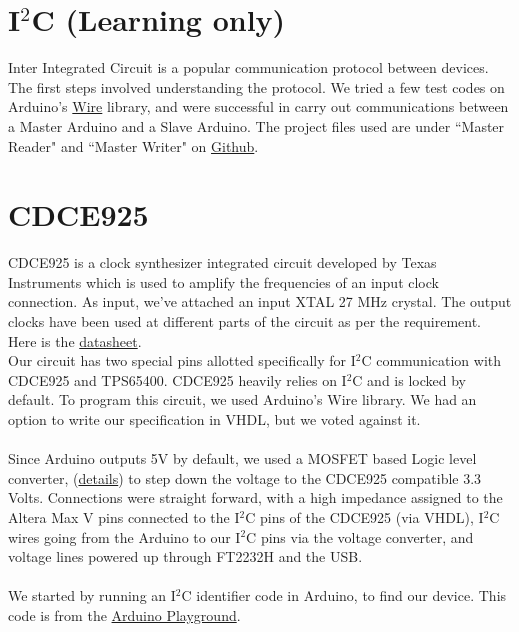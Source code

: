 \documentclass[11pt]{article}
\begin{document}
\section{I$^2$C (Learning only)}

Inter Integrated Circuit is a popular communication protocol between devices. The first steps involved understanding the protocol. We tried a few test codes on Arduino's \href{https://www.arduino.cc/en/Reference/Wire}{Wire} library, and were successful in carry out communications between a Master Arduino and a Slave Arduino. The project files used are under ``Master Reader" and ``Master Writer" on \href{https://github.com/Abhin02/FPGA/tree/master/src/Arduino/}{Github}.\\

\section{CDCE925}
CDCE925 is a clock synthesizer integrated circuit developed by Texas Instruments which is used to amplify the frequencies of an input clock connection. As input, we've attached an input XTAL 27 MHz crystal. The output clocks have been used at different parts of the circuit as per the requirement.\\ Here is the \href{http://www.ti.com.cn/cn/lit/ds/symlink/cdce925.pdf}{datasheet}.\\
Our circuit has two special pins allotted specifically for I$^2$C communication with CDCE925 and TPS65400. CDCE925 heavily relies on I$^2$C and is locked by default. To program this circuit, we used Arduino's Wire library. We had an option to write our specification in VHDL, but we voted against it.\\\\
Since Arduino outputs 5V by default, we used a MOSFET based Logic level converter, (\href{www.rhydolabz.com/interfacing-modules-c-80/logic-level-converter-4-channel-p-1045.html}{details}) to step down the voltage to the CDCE925 compatible 3.3 Volts. Connections were straight forward, with a high impedance assigned to the Altera Max V pins connected to the I$^2$C pins of the CDCE925 (via VHDL), I$^2$C wires going from the Arduino to our I$^2$C pins via the voltage converter, and voltage lines powered up through FT2232H and the USB.\\\\
We started by running an I$^2$C identifier code in Arduino, to find our device. This code is from the \href{http://playground.arduino.cc/Main/I2cScanner}{Arduino Playground}.\\
\end{document}
